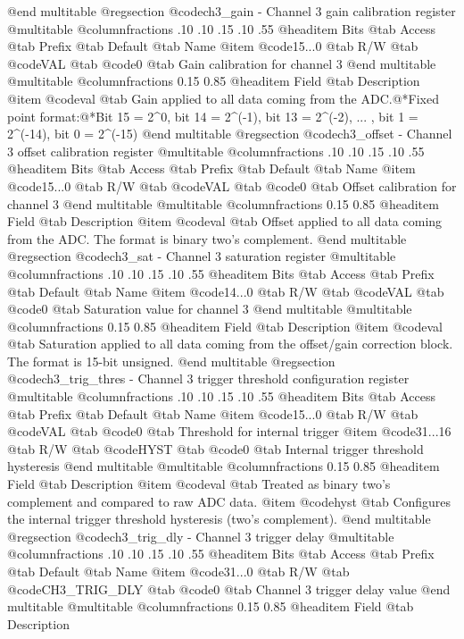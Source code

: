 @end multitable
@regsection @code{ch3_gain} - Channel 3 gain calibration register
@multitable @columnfractions .10 .10 .15 .10 .55
@headitem Bits @tab Access @tab Prefix @tab Default @tab Name
@item @code{15...0}
@tab R/W @tab
@code{VAL}
@tab @code{0} @tab 
Gain calibration for channel 3
@end multitable
@multitable @columnfractions 0.15 0.85
@headitem Field @tab Description
@item @code{val} @tab Gain applied to all data coming from the ADC.@*Fixed point format:@*Bit 15 = 2^0, bit 14 = 2^(-1), bit 13 = 2^(-2), ... , bit 1 = 2^(-14), bit 0 = 2^(-15)
@end multitable
@regsection @code{ch3_offset} - Channel 3 offset calibration register
@multitable @columnfractions .10 .10 .15 .10 .55
@headitem Bits @tab Access @tab Prefix @tab Default @tab Name
@item @code{15...0}
@tab R/W @tab
@code{VAL}
@tab @code{0} @tab 
Offset calibration for channel 3
@end multitable
@multitable @columnfractions 0.15 0.85
@headitem Field @tab Description
@item @code{val} @tab Offset applied to all data coming from the ADC. The format is binary two's complement.
@end multitable
@regsection @code{ch3_sat} - Channel 3 saturation register
@multitable @columnfractions .10 .10 .15 .10 .55
@headitem Bits @tab Access @tab Prefix @tab Default @tab Name
@item @code{14...0}
@tab R/W @tab
@code{VAL}
@tab @code{0} @tab 
Saturation value for channel 3
@end multitable
@multitable @columnfractions 0.15 0.85
@headitem Field @tab Description
@item @code{val} @tab Saturation applied to all data coming from the offset/gain correction block. The format is 15-bit unsigned.
@end multitable
@regsection @code{ch3_trig_thres} - Channel 3 trigger threshold configuration register
@multitable @columnfractions .10 .10 .15 .10 .55
@headitem Bits @tab Access @tab Prefix @tab Default @tab Name
@item @code{15...0}
@tab R/W @tab
@code{VAL}
@tab @code{0} @tab 
Threshold for internal trigger
@item @code{31...16}
@tab R/W @tab
@code{HYST}
@tab @code{0} @tab 
Internal trigger threshold hysteresis
@end multitable
@multitable @columnfractions 0.15 0.85
@headitem Field @tab Description
@item @code{val} @tab Treated as binary two's complement and compared to raw ADC data.
@item @code{hyst} @tab Configures the internal trigger threshold hysteresis (two's complement).
@end multitable
@regsection @code{ch3_trig_dly} - Channel 3 trigger delay
@multitable @columnfractions .10 .10 .15 .10 .55
@headitem Bits @tab Access @tab Prefix @tab Default @tab Name
@item @code{31...0}
@tab R/W @tab
@code{CH3_TRIG_DLY}
@tab @code{0} @tab 
Channel 3 trigger delay value
@end multitable
@multitable @columnfractions 0.15 0.85
@headitem Field @tab Description
